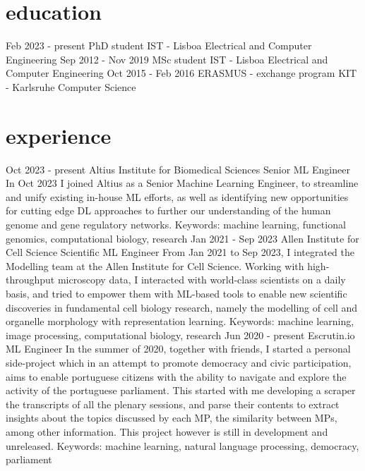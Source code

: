 \documentclass[]{colobas-cv}
\begin{document}
\section{education}
\entry
  {Feb 2023 - present}
  {PhD student}
  {IST - Lisboa}
  {Electrical and Computer Engineering}
\entry
  {Sep 2012 - Nov 2019}
  {MSc student}
  {IST - Lisboa}
  {Electrical and Computer Engineering}
\entry
  {Oct 2015 - Feb 2016}
  {ERASMUS - exchange program}
  {KIT - Karlsruhe}
  {Computer Science}

\section{experience}
\entry
  {Oct 2023 - present}
  {Altius Institute for Biomedical Sciences}
  {Senior ML Engineer}
  {In Oct 2023 I joined Altius as a Senior Machine Learning Engineer, to streamline
   and unify existing in-house ML efforts, as well as identifying new opportunities
   for cutting edge DL approaches to further our understanding of the human genome
   and gene regulatory networks.
   Keywords: machine learning, functional genomics, computational biology, research}
\entry
  {Jan 2021 - Sep 2023}
  {Allen Institute for Cell Science}
  {Scientific ML Engineer}
  {From Jan 2021 to Sep 2023, I integrated the Modelling team at the Allen Institute
   for Cell Science. Working with high-throughput microscopy data, I interacted
   with world-class scientists on a daily basis, and tried to empower them with
   ML-based tools to enable new scientific discoveries in fundamental cell
   biology research, namely the modelling of cell and organelle morphology with
   representation learning.
   Keywords: machine learning, image processing, computational biology, research}
\entry
  {Jun 2020 - present}
  {Escrutin.io}
  {ML Engineer}
  {In the summer of 2020, together with friends, I started a personal side-project
   which in an attempt to promote democracy and civic participation, aims to enable
   portuguese citizens with the ability to navigate and explore the activity of the
   portuguese parliament. This started with me developing a scraper
   the transcripts of all the plenary sessions, and parse their contents to extract insights
   about the topics discussed by each MP, the similarity between MPs, among other information.
   This project however is still in development and unreleased.
   Keywords: machine learning, natural language processing, democracy, parliament}
\end{document}
